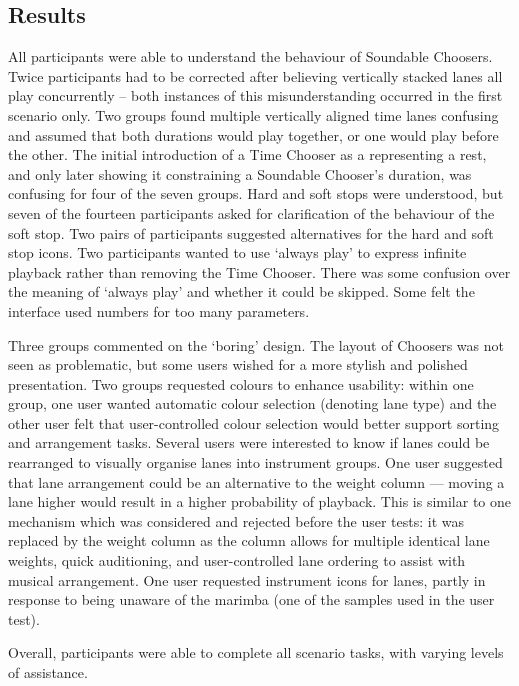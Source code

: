 \documentclass[]{article}
\begin{document}
\hypertarget{results}{%
\subsection{Results}\label{results}}

All participants were able to understand the behaviour of Soundable
Choosers. Twice participants had to be corrected after believing
vertically stacked lanes all play concurrently -- both instances of this
misunderstanding occurred in the first scenario only. Two groups found
multiple vertically aligned time lanes confusing and assumed that both
durations would play together, or one would play before the other. The
initial introduction of a Time Chooser as a representing a rest, and
only later showing it constraining a Soundable Chooser's duration, was
confusing for four of the seven groups. Hard and soft stops were
understood, but seven of the fourteen participants asked for
clarification of the behaviour of the soft stop. Two pairs of
participants suggested alternatives for the hard and soft stop icons.
Two participants wanted to use `always play' to express infinite
playback rather than removing the Time Chooser. There was some confusion
over the meaning of `always play' and whether it could be skipped. Some
felt the interface used numbers for too many parameters.

Three groups commented on the `boring' design. The layout of Choosers
was not seen as problematic, but some users wished for a more stylish
and polished presentation. Two groups requested colours to enhance
usability: within one group, one user wanted automatic colour selection
(denoting lane type) and the other user felt that user-controlled colour
selection would better support sorting and arrangement tasks. Several
users were interested to know if lanes could be rearranged to visually
organise lanes into instrument groups. One user suggested that lane
arrangement could be an alternative to the weight column --- moving a
lane higher would result in a higher probability of playback. This is
similar to one mechanism which was considered and rejected before the
user tests: it was replaced by the weight column as the column allows
for multiple identical lane weights, quick auditioning, and
user-controlled lane ordering to assist with musical arrangement. One
user requested instrument icons for lanes, partly in response to being
unaware of the marimba (one of the samples used in the user test).

Overall, participants were able to complete all scenario tasks, with
varying levels of assistance.
\end{document}
